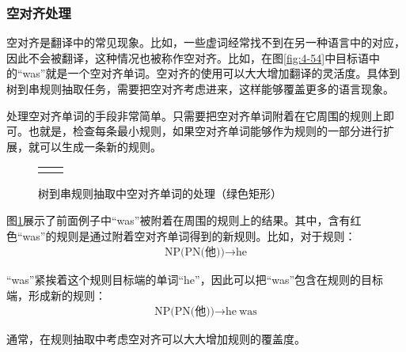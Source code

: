 
\subsubsection{空对齐处理}

\parinterval 空对齐是翻译中的常见现象。比如，一些虚词经常找不到在另一种语言中的对应，因此不会被翻译，这种情况也被称作空对齐。比如，在图\ref{fig:4-54}中目标语中的``was''就是一个空对齐单词。空对齐的使用可以大大增加翻译的灵活度。具体到树到串规则抽取任务，需要把空对齐考虑进来，这样能够覆盖更多的语言现象。

\parinterval 处理空对齐单词的手段非常简单。只需要把空对齐单词附着在它周围的规则上即可。也就是，检查每条最小规则，如果空对齐单词能够作为规则的一部分进行扩展，就可以生成一条新的规则。

\begin{figure}[htp]
\centering
\begin{tabular}{l l}
\subfigure{} &  \subfigure{}
\end{tabular}
\caption{树到串规则抽取中空对齐单词的处理（绿色矩形）}
\label{fig:4-55}
\end{figure}

\parinterval 图\ref{fig:4-55}展示了前面例子中``was''被附着在周围的规则上的结果。其中，含有红色``was''的规则是通过附着空对齐单词得到的新规则。比如，对于规则：
\begin{eqnarray}
\textrm{NP(PN(他))} \rightarrow \textrm{he} \nonumber
\end{eqnarray}

\parinterval ``was''紧挨着这个规则目标端的单词``he''，因此可以把``was''包含在规则的目标端，形成新的规则：
\begin{eqnarray}
\textrm{NP(PN(他))} \rightarrow \textrm{he}\ \textrm{was} \nonumber
\end{eqnarray}

\parinterval 通常，在规则抽取中考虑空对齐可以大大增加规则的覆盖度。


